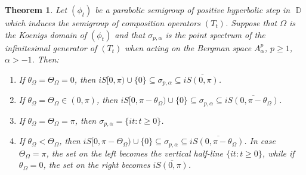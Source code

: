 \documentclass[11pt]{amsart}
\numberwithin{equation}{section}
\newtheorem{theorem}{Theorem}[section]
\theoremstyle{definition}
\DeclareMathOperator{\D}{\mathbb{D}}
\begin{document}
	\begin{theorem}\label{thm:bergman phs}
		Let $(\phi_t)$ be a parabolic semigroup of positive hyperbolic step in $\D$ which induces the semigroup of composition operators $(T_t)$. Suppose that $\Omega$ is the Koenigs domain of $(\phi_t)$ and that $\sigma_{p,\alpha}$ is the point spectrum of the infinitesimal generator of $(T_t)$ when acting on the Bergman space $A_\alpha^p$, $p\ge1$, $\alpha>-1$. Then:
		\begin{enumerate}
			\item[\textup{(a)}] If $\theta_\Omega=\Theta_\Omega=0$, then $iS[0,\pi)\cup\{0\}\subseteq\sigma_{p,\alpha}\subseteq i\overline{S(0,\pi)}$.
			\item[\textup{(b)}] If $\theta_\Omega=\Theta_\Omega\in(0,\pi)$, then $iS[0,\pi-\theta_\Omega)\cup\{0\}\subseteq \sigma_{p,\alpha} \subseteq i\overline{S(0,\pi-\theta_\Omega)}$.
			\item[\textup{(c)}] If $\theta_\Omega=\Theta_\Omega=\pi$, then $\sigma_{p,\alpha}=\{it:t\ge0\}$.
			\item[\textup{(d)}] If $\theta_\Omega<\Theta_\Omega$, then $iS[0,\pi-\Theta_\Omega)\cup\{0\}\subseteq\sigma_{p,\alpha}\subseteq i\overline{S(0,\pi-\theta_\Omega)}$. In case $\Theta_\Omega=\pi$, the set on the left becomes the vertical half-line $\{it:t\ge0\}$, while if $\theta_\Omega=0$, the set on the right becomes $i\overline{S(0,\pi)}$.
		\end{enumerate}
	\end{theorem}
\end{document}
